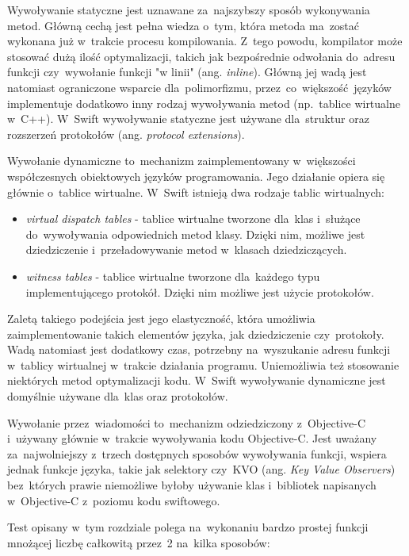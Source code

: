 \documentclass[mgr, shortabstract]{iithesis}
\newcommand{\ang}[1]{ang. \textit{#1}}
\begin{document}
Wywoływanie statyczne jest uznawane za~najszybszy sposób wykonywania metod. Główną cechą jest pełna wiedza o~tym, która metoda ma~zostać wykonana już w~trakcie procesu kompilowania. Z~tego powodu, kompilator może stosować dużą ilość optymalizacji, takich jak bezpośrednie odwołania do~adresu funkcji czy~wywołanie funkcji "w linii" (\ang{inline}). Główną jej wadą jest natomiast ograniczone wsparcie dla~polimorfizmu, przez~co~większość języków implementuje dodatkowo inny rodzaj wywoływania metod (np.~tablice wirtualne w~C++). W~Swift wywoływanie statyczne jest używane dla~struktur oraz rozszerzeń protokołów (\ang{protocol extensions}).

Wywołanie dynamiczne to~mechanizm zaimplementowany w~większości współczesnych obiektowych języków programowania. Jego działanie opiera się głównie o~tablice wirtualne. W~Swift istnieją dwa rodzaje tablic wirtualnych:

\begin{itemize}
    \item \textit{virtual dispatch tables} - tablice wirtualne tworzone dla~klas i~służące do~wywoływania odpowiednich metod klasy. Dzięki nim, możliwe jest dziedziczenie i~przeładowywanie metod w~klasach dziedziczących.
    \item \textit{witness tables} - tablice wirtualne tworzone dla~każdego typu implementującego protokół. Dzięki nim możliwe jest użycie protokołów.
\end{itemize}

Zaletą takiego podejścia jest jego elastyczność, która umożliwia zaimplementowanie takich elementów języka, jak dziedziczenie czy~protokoły. Wadą natomiast jest dodatkowy czas, potrzebny na~wyszukanie adresu funkcji w~tablicy wirtualnej w~trakcie działania programu. Uniemożliwia też stosowanie niektórych metod optymalizacji kodu. W~Swift wywoływanie dynamiczne jest domyślnie używane dla~klas oraz protokołów.

Wywołanie przez~wiadomości to~mechanizm odziedziczony z~Objective-C i~używany głównie w~trakcie wywoływania kodu Objective-C. Jest uważany za~najwolniejszy z~trzech dostępnych sposobów wywoływania funkcji, wspiera jednak funkcje języka, takie jak selektory czy~KVO (\ang{Key Value Observers}) bez~których prawie niemożliwe byłoby używanie klas i~bibliotek napisanych w~Objective-C z~poziomu kodu swiftowego.

Test opisany w~tym rozdziale polega na~wykonaniu bardzo prostej funkcji mnożącej liczbę całkowitą przez~2 na~kilka sposobów:
\end{document}
